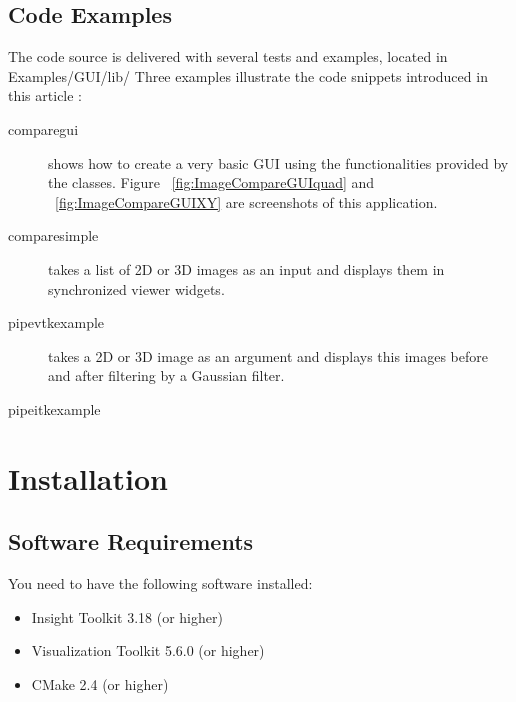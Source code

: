 \documentclass{InsightArticle}
\begin{document}
\subsection*{Code Examples}
The code source is delivered with several tests and examples, located in
Examples/GUI/lib/
Three examples illustrate the code snippets introduced in this article :
\begin{description}
  \item [comparegui] shows how to create a very basic GUI using the
functionalities provided by the  classes. Figure
~\ref{fig:ImageCompareGUIquad} and ~\ref{fig:ImageCompareGUIXY} are screenshots
of this application.
  \item [comparesimple] takes a list of 2D or 3D images as
an input and displays them in synchronized viewer widgets.
  \item [pipevtkexample] takes a 2D or 3D image as an argument and displays this
images before and after filtering by a Gaussian filter.
  \item [pipeitkexample] 
\end{description}


\section{Installation}
\subsection*{Software Requirements}
You need to have the following software installed:
\begin{itemize}
  \item  Insight Toolkit 3.18 (or higher)
  \item  Visualization Toolkit 5.6.0 (or higher)
  \item  CMake 2.4 (or higher)
\end{itemize}
\end{document}
